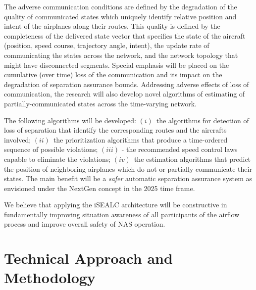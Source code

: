 \documentclass[letter,onecolumn,12pt]{aiaa-tc}
\newcommand{\1}{1_n}
\begin{document}
The adverse communication conditions are defined by the degradation of the quality of communicated states which uniquely identify relative position and intent of the airplanes along their routes. This quality is defined by the completeness of the delivered state vector that specifies the state of the aircraft (position, speed course, trajectory angle, intent), the update rate of communicating the states across the network, and the network topology that might have disconnected segments. Special emphasis will be placed on the cumulative (over time) loss of the communication and its impact on the degradation of separation assurance bounds. Addressing adverse effects of loss of communication, the research will also develop novel algorithms of estimating of partially-communicated states across the time-varying network.

The following algorithms will be developed: $(i)$~the algorithms for detection of loss of separation that identify the corresponding routes and the aircrafts involved; $(ii)$~the prioritization algorithms that produce a time-ordered sequence of possible violations; $(iii)$ - the recommended speed control laws capable to eliminate the violations; $(iv)$~the estimation algorithms that predict the position of neighboring airplanes which do not or partially communicate their states. The main benefit will be a \emph{safer} automatic separation assurance system as envisioned under the NextGen concept in the 2025 time frame.

We believe that applying the iSEALC architecture will be constructive in fundamentally improving situation awareness of all participants of the airflow process and improve overall safety of NAS operation.


\section{Technical Approach and Methodology}

\end{document}
